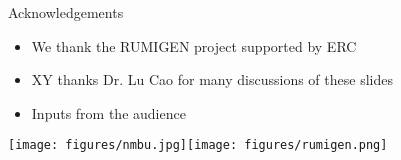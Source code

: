 \documentclass{beamer}
\begin{document}
\begin{frame}{Acknowledgements}
  \begin{itemize}
    \item We thank the RUMIGEN project supported by ERC
    \item XY thanks Dr. Lu Cao for many discussions of these slides
    \item Inputs from the audience
  \end{itemize}
  
  \vspace{1cm}
  
  \begin{center}
    \texttt{[image: figures/nmbu.jpg]}\phantom{gap}\texttt{[image: figures/rumigen.png]}  
  \end{center}
\end{frame}
\end{document}
